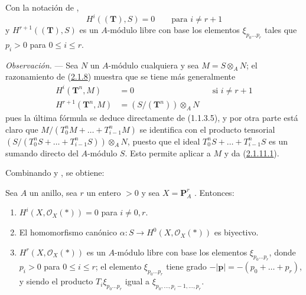 \begin{corollary}[2.1.10]
\label{III.2.1.10}
\label{III.2.1.10-fr}
Con la notación de ,
\begin{equation}
\label{III.2.1.10.1-fr}
\tag{2.1.10.1}
H^i((\mathbf T),S)=0\qquad\text{para }i\neq r+1
\end{equation}
y $H^{r+1}((\mathbf T),S)$ es un $A$-módulo libre con base los elementos $\xi_{p_0\ldots p_r}$ tales que $p_i>0$ para $0\leq i\leq r$.
\end{corollary}

\begin{env}[2.1.11]
\label{III.2.1.11}
\label{III.2.1.11-fr}
\emph{Observación.} ---
Sea $N$ un $A$-módulo cualquiera y sea $M=S\otimes_A N$; el razonamiento de
(\hyperref[III.2.1.8-fr]{2.1.8}) muestra que se tiene más generalmente
\begin{align}
\label{III.2.1.11.1-fr}
\tag{2.1.11.1}
H^i(\mathbf T^n,M)&=0 &&\text{si }i\neq r+1\\
\label{III.2.1.11.2-fr}
\tag{2.1.11.2}
H^{r+1}(\mathbf T^n,M)&=(S/(\mathbf T^n))\otimes_A N
\end{align}
pues la última fórmula se deduce directamente de (1.1.3.5), y por otra
parte está claro que
$M/(T_0^nM+\ldots+T_{i-1}^nM)$ se identifica con el producto tensorial $(S/(T_0^nS+\ldots+T_{i-1}^nS))\otimes_A N$,
puesto que el ideal $T_0^nS+\ldots+T_{i-1}^nS$ es un sumando directo del $A$-módulo $S$.
Esto permite aplicar  a $M$ y da (\hyperref[III.2.1.11.1]{2.1.11.1}).
\end{env}

Combinando  y , se obtiene:

\begin{proposition}[2.1.12]
\label{III.2.1.12}
\label{III.2.1.12-fr}
Sea $A$ un anillo, sea $r$ un entero $>0$ y sea $X=\mathbf P_A^r$ .
Entonces:
\begin{enumerate}
  \item[{\rm(i)}] $H^i(X,\mathcal O_X(*))=0$ para $i\neq0,r$.
  \item[{\rm(ii)}] El homomorfismo canónico $\alpha:S\to H^0(X,\mathcal O_X(*))$  es biyectivo.
  \item[{\rm(iii)}] $H^r(X,\mathcal O_X(*))$ es un $A$-módulo libre con base los elementos $\xi_{p_0\ldots p_r}$, donde $p_i>0$ para $0\leq i\leq r$; el elemento $\xi_{p_0\ldots p_r}$ tiene grado $-|\mathbf p|=-(p_0+\ldots+p_r)$, y siendo el producto
$T_i\xi_{p_0\ldots p_r}$ igual a
$\xi_{p_0,\ldots,p_i-1,\ldots,p_r}$.
\end{enumerate}
\end{proposition}

